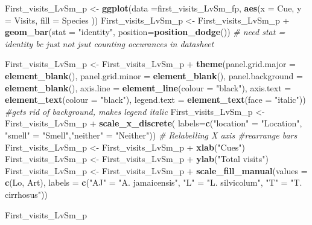 \documentclass[]{article}
\newenvironment{Shaded}{\begin{snugshade}}{\end{snugshade}}
\newcommand{\KeywordTok}[1]{\textcolor[rgb]{0.13,0.29,0.53}{\textbf{{#1}}}}
\newcommand{\DataTypeTok}[1]{\textcolor[rgb]{0.13,0.29,0.53}{{#1}}}
\newcommand{\StringTok}[1]{\textcolor[rgb]{0.31,0.60,0.02}{{#1}}}
\newcommand{\CommentTok}[1]{\textcolor[rgb]{0.56,0.35,0.01}{\textit{{#1}}}}
\newcommand{\NormalTok}[1]{{#1}}
\begin{document}
\begin{Shaded}
\begin{Highlighting}[]
\NormalTok{First_visits_LvSm_p <-}\StringTok{ }\KeywordTok{ggplot}\NormalTok{(}\DataTypeTok{data =}\NormalTok{first_visits_LvSm_fp, }\KeywordTok{aes}\NormalTok{(}\DataTypeTok{x =} \NormalTok{Cue, }\DataTypeTok{y =} \NormalTok{Visits, }\DataTypeTok{fill =} \NormalTok{Species ))}
\NormalTok{First_visits_LvSm_p <-}\StringTok{ }\NormalTok{First_visits_LvSm_p +}\StringTok{ }\KeywordTok{geom_bar}\NormalTok{(}\DataTypeTok{stat =} \StringTok{"identity"}\NormalTok{, }\DataTypeTok{position=}\KeywordTok{position_dodge}\NormalTok{()) }\CommentTok{# need stat = identity bc just not jsut counting occurances in datasheet}

\NormalTok{First_visits_LvSm_p  <-}\StringTok{ }\NormalTok{First_visits_LvSm_p  +}\StringTok{ }\KeywordTok{theme}\NormalTok{(}\DataTypeTok{panel.grid.major =} \KeywordTok{element_blank}\NormalTok{(), }\DataTypeTok{panel.grid.minor =} \KeywordTok{element_blank}\NormalTok{(),}
\DataTypeTok{panel.background =} \KeywordTok{element_blank}\NormalTok{(), }\DataTypeTok{axis.line =} \KeywordTok{element_line}\NormalTok{(}\DataTypeTok{colour =} \StringTok{"black"}\NormalTok{), }\DataTypeTok{axis.text =} \KeywordTok{element_text}\NormalTok{(}\DataTypeTok{colour =} \StringTok{"black"}\NormalTok{), }\DataTypeTok{legend.text =} \KeywordTok{element_text}\NormalTok{(}\DataTypeTok{face =} \StringTok{"italic"}\NormalTok{))  }\CommentTok{#gets rid of background, makes legend italic}
\NormalTok{First_visits_LvSm_p  <-}\StringTok{ }\NormalTok{First_visits_LvSm_p  +}\StringTok{ }\KeywordTok{scale_x_discrete}\NormalTok{( }\DataTypeTok{labels=}\KeywordTok{c}\NormalTok{(}\StringTok{"location"} \NormalTok{=}\StringTok{ "Location"}\NormalTok{, }\StringTok{"smell"} \NormalTok{=}\StringTok{ "Smell"}\NormalTok{,}\StringTok{"neither"} \NormalTok{=}\StringTok{ "Neither"}\NormalTok{))  }\CommentTok{# Relabelling X axis #rearrange bars}
\NormalTok{First_visits_LvSm_p  <-}\StringTok{ }\NormalTok{First_visits_LvSm_p  +}\StringTok{ }\KeywordTok{xlab}\NormalTok{(}\StringTok{"Cues"}\NormalTok{)}
\NormalTok{First_visits_LvSm_p  <-}\StringTok{ }\NormalTok{First_visits_LvSm_p  +}\StringTok{ }\KeywordTok{ylab}\NormalTok{(}\StringTok{"Total visits"}\NormalTok{)}
\NormalTok{First_visits_LvSm_p  <-}\StringTok{ }\NormalTok{First_visits_LvSm_p  +}\StringTok{ }\KeywordTok{scale_fill_manual}\NormalTok{(}\DataTypeTok{values =} \KeywordTok{c}\NormalTok{(Lo, Art), }\DataTypeTok{labels =} \KeywordTok{c}\NormalTok{(}\StringTok{"AJ"} \NormalTok{=}\StringTok{ "A. jamaicensis"}\NormalTok{, }\StringTok{"L"} \NormalTok{=}\StringTok{ "L. silvicolum"}\NormalTok{, }\StringTok{"T"} \NormalTok{=}\StringTok{ "T. cirrhosus"}\NormalTok{))}

\NormalTok{First_visits_LvSm_p}
\end{Highlighting}
\end{Shaded}
\end{document}
